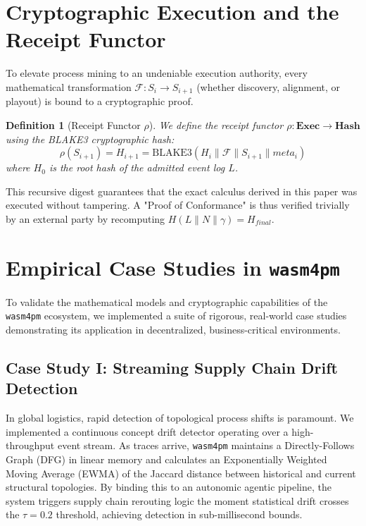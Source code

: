 \documentclass[11pt,a4paper,twocolumn]{article}
\newtheorem{definition}{Definition}
\begin{document}
\section{Cryptographic Execution and the Receipt Functor}
To elevate process mining to an undeniable execution authority, every mathematical transformation $\mathcal{F}: S_i \to S_{i+1}$ (whether discovery, alignment, or playout) is bound to a cryptographic proof.

\begin{definition}[Receipt Functor $\rho$]
We define the receipt functor $\rho: \mathbf{Exec} \to \mathbf{Hash}$ using the BLAKE3 cryptographic hash:
\[
\rho(S_{i+1}) = H_{i+1} = \text{BLAKE3}( H_i \parallel \mathcal{F} \parallel S_{i+1} \parallel meta_i )
\]
where $H_0$ is the root hash of the admitted event log $L$.
\end{definition}

This recursive digest guarantees that the exact calculus derived in this paper was executed without tampering. A "Proof of Conformance" is thus verified trivially by an external party by recomputing $H(L \parallel N \parallel \gamma) = H_{final}$.

\section{Empirical Case Studies in \texttt{wasm4pm}}
To validate the mathematical models and cryptographic capabilities of the \texttt{wasm4pm} ecosystem, we implemented a suite of rigorous, real-world case studies demonstrating its application in decentralized, business-critical environments.

\subsection{Case Study I: Streaming Supply Chain Drift Detection}
In global logistics, rapid detection of topological process shifts is paramount. We implemented a continuous concept drift detector operating over a high-throughput event stream. As traces arrive, \texttt{wasm4pm} maintains a Directly-Follows Graph (DFG) in linear memory and calculates an Exponentially Weighted Moving Average (EWMA) of the Jaccard distance between historical and current structural topologies. By binding this to an autonomic agentic pipeline, the system triggers supply chain rerouting logic the moment statistical drift crosses the $\tau=0.2$ threshold, achieving detection in sub-millisecond bounds.
\end{document}
